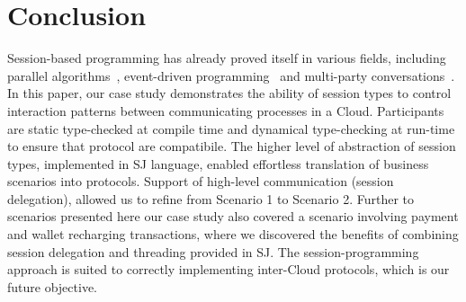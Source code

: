 \documentclass[10pt]{llncs}
\begin{document}
\section{Conclusion}
\label{sect:conclusion}
Session-based programming has already proved itself in various fields, including parallel algorithms~\cite{sj-parallel}, event-driven programming~\cite{event-driven-sj} and multi-party conversations~\cite{sj-business-protocols}.
In this paper, our case study demonstrates the ability of session types to control interaction patterns between communicating processes in a Cloud.
Participants are static type-checked at compile time and dynamical type-checking at run-time to ensure that protocol are compatibile.
The higher level of abstraction of session types, implemented in SJ language, enabled effortless translation of business scenarios into protocols.
Support of high-level communication (session delegation), allowed us to refine from Scenario 1 to Scenario 2.
Further to scenarios presented here our case study also covered a scenario involving payment and wallet recharging transactions, %
where we discovered the benefits of combining session delegation and threading provided in SJ.
The session-programming approach is suited to correctly implementing inter-Cloud protocols, which is our future objective. %


%
\label{sect:bib}

%
%
%


\appendix




\end{document}
